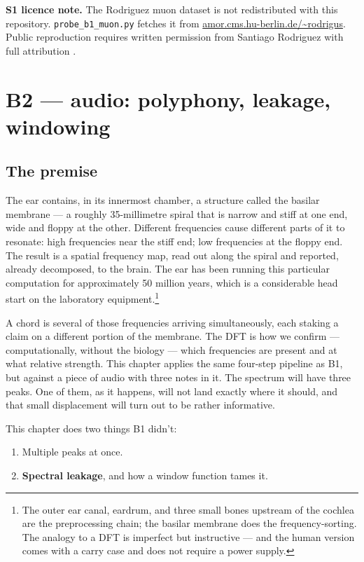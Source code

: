 \documentclass[11pt,a4paper,openany]{book}
\begin{document}
\textbf{S1 licence note.} The Rodriguez muon dataset is not redistributed
with this repository. \texttt{probe\_b1\_muon.py} fetches it from
\url{amor.cms.hu-berlin.de/~rodrigus}. Public reproduction requires
written permission from Santiago Rodriguez with full attribution
\cite{Rodriguez2018}.



\chapter{B2 --- audio: polyphony, leakage, windowing}
\label{ch:b2}

\section{The premise}

The ear contains, in its innermost chamber, a structure called the basilar
membrane --- a roughly 35-millimetre spiral that is narrow and stiff at one
end, wide and floppy at the other. Different frequencies cause different parts
of it to resonate: high frequencies near the stiff end; low frequencies at the
floppy end. The result is a spatial frequency map, read out along the spiral
and reported, already decomposed, to the brain. The ear has been running this
particular computation for approximately 50 million years, which is a
considerable head start on the laboratory
equipment.\footnote{The outer ear canal, eardrum, and three small bones
upstream of the cochlea are the preprocessing chain; the basilar membrane does
the frequency-sorting. The analogy to a DFT is imperfect but instructive ---
and the human version comes with a carry case and does not require a power
supply.}

A chord is several of those frequencies arriving simultaneously, each staking
a claim on a different portion of the membrane. The DFT is how we confirm ---
computationally, without the biology --- which frequencies are present and at
what relative strength. This chapter applies the same four-step pipeline as
B1, but against a piece of audio with three notes in it. The spectrum will
have three peaks. One of them, as it happens, will not land exactly where it
should, and that small displacement will turn out to be rather informative.

This chapter does two things B1 didn't:
\begin{enumerate}[label=\arabic*.,leftmargin=*,itemsep=0pt]
\item Multiple peaks at once.
\item \textbf{Spectral leakage}, and how a window function tames it.
\end{enumerate}
\end{document}
